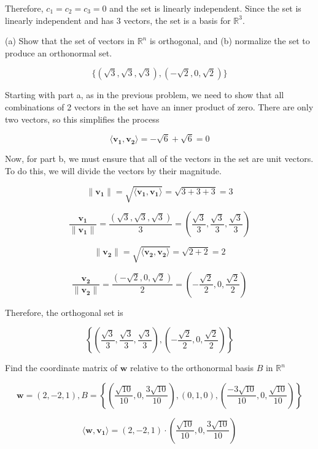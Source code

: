 \documentclass{report}
\begin{document}
Therefore, $c_1 = c_2 = c_3 = 0$ and the set is linearly independent. Since the set is linearly independent and has 3 vectors, the set is a basis for $\mathbb{R}^3$.\\

\begin{tcolorbox}[colframe = lightred]
	(a) Show that the set of vectors in $\mathbb{R}^n$ is orthogonal, and (b) normalize the set to produce an orthonormal set.
	
	$$
	 \{ (\sqrt{3}, \sqrt{3}, \sqrt{3}), (-\sqrt{2}, 0, \sqrt{2})\}
	$$
\end{tcolorbox}


Starting with part a, as in the previous problem, we need to show that all combinations of 2 vectors in the set have an inner product of zero. There are only two vectors, so this simplifies the process

$$
\langle \bm{v_1}, \bm{v_2} \rangle = -\sqrt{6} + \sqrt{6} = 0
$$

Now, for part b, we must ensure that all of the vectors in the set are unit vectors. To do this, we will divide the vectors by their magnitude.

$$
\| \bm{v_1} \| = \sqrt{\langle \bm{v_1}, \bm{v_1} \rangle} = \sqrt{3+3+3} = 3
$$

$$
\frac{\bm{v_1}}{\| \bm{v_1} \|} = \frac{(\sqrt{3}, \sqrt{3}, \sqrt{3})}{3} = \left(\frac{\sqrt{3}}{3}, \frac{\sqrt{3}}{3}, \frac{\sqrt{3}}{3}\right)
$$

$$
\| \bm{v_2} \| = \sqrt{\langle \bm{v_2}, \bm{v_2} \rangle} = \sqrt{2+2} = 2
$$

$$
\frac{\bm{v_2}}{\| \bm{v_2} \|} = \frac{(-\sqrt{2}, 0, \sqrt{2})}{2} = \left( -\frac{\sqrt{2}}{2}, 0, \frac{\sqrt{2}}{2}\right)
$$

Therefore, the orthogonal set is

$$
\left\{ \left(\frac{\sqrt{3}}{3}, \frac{\sqrt{3}}{3}, \frac{\sqrt{3}}{3}\right),  \left( -\frac{\sqrt{2}}{2}, 0, \frac{\sqrt{2}}{2}\right) \right\}
$$

\begin{tcolorbox}[colframe = lightred]
	Find the coordinate matrix of $\bm{w}$ relative to the orthonormal basis $B$ in $\mathbb{R}^n$
	
	$$
	\bm{w} = (2,-2,1), B = \left\{ \left( \frac{\sqrt{10}}{10}, 0, \frac{3\sqrt{10}}{10}\right), (0,1,0), \left( \frac{-3\sqrt{10}}{10}, 0, \frac{\sqrt{10}}{10} \right)\right\}
	$$
\end{tcolorbox}

$$
\langle \bm{w}, \bm{v_1} \rangle =	(2,-2,1) \cdot \left(\frac{\sqrt{10}}{10}, 0, \frac{3\sqrt{10}}{10} \right)
$$
\end{document}
